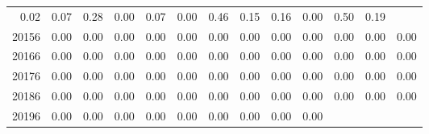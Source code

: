 \begin{table}[!h]
\begin{tabular}{lllllllllllll}
  \multicolumn{1}{|r}{0.02} &
  \multicolumn{1}{r}{0.07} &
  \multicolumn{1}{r}{0.28} &
  \multicolumn{1}{r}{0.00} &
  \multicolumn{1}{r}{0.07} &
  \multicolumn{1}{r}{0.00} &
  \multicolumn{1}{r}{0.46} &
  \multicolumn{1}{r}{0.15} &
  \multicolumn{1}{r}{0.16} &
  \multicolumn{1}{r}{0.00} &
  \multicolumn{1}{r}{0.50} &
  \multicolumn{1}{r}{0.19} \\
\multicolumn{1}{l}{\hspace{1em}20156} &
  \multicolumn{1}{|r}{0.00} &
  \multicolumn{1}{r}{0.00} &
  \multicolumn{1}{r}{0.00} &
  \multicolumn{1}{r}{0.00} &
  \multicolumn{1}{r}{0.00} &
  \multicolumn{1}{r}{0.00} &
  \multicolumn{1}{r}{0.00} &
  \multicolumn{1}{r}{0.00} &
  \multicolumn{1}{r}{0.00} &
  \multicolumn{1}{r}{0.00} &
  \multicolumn{1}{r}{0.00} &
  \multicolumn{1}{r}{0.00} \\
\multicolumn{1}{l}{\hspace{1em}20166} &
  \multicolumn{1}{|r}{0.00} &
  \multicolumn{1}{r}{0.00} &
  \multicolumn{1}{r}{0.00} &
  \multicolumn{1}{r}{0.00} &
  \multicolumn{1}{r}{0.00} &
  \multicolumn{1}{r}{0.00} &
  \multicolumn{1}{r}{0.00} &
  \multicolumn{1}{r}{0.00} &
  \multicolumn{1}{r}{0.00} &
  \multicolumn{1}{r}{0.00} &
  \multicolumn{1}{r}{0.00} &
  \multicolumn{1}{r}{0.00} \\
\multicolumn{1}{l}{\hspace{1em}20176} &
  \multicolumn{1}{|r}{0.00} &
  \multicolumn{1}{r}{0.00} &
  \multicolumn{1}{r}{0.00} &
  \multicolumn{1}{r}{0.00} &
  \multicolumn{1}{r}{0.00} &
  \multicolumn{1}{r}{0.00} &
  \multicolumn{1}{r}{0.00} &
  \multicolumn{1}{r}{0.00} &
  \multicolumn{1}{r}{0.00} &
  \multicolumn{1}{r}{0.00} &
  \multicolumn{1}{r}{0.00} &
  \multicolumn{1}{r}{0.00} \\
\multicolumn{1}{l}{\hspace{1em}20186} &
  \multicolumn{1}{|r}{0.00} &
  \multicolumn{1}{r}{0.00} &
  \multicolumn{1}{r}{0.00} &
  \multicolumn{1}{r}{0.00} &
  \multicolumn{1}{r}{0.00} &
  \multicolumn{1}{r}{0.00} &
  \multicolumn{1}{r}{0.00} &
  \multicolumn{1}{r}{0.00} &
  \multicolumn{1}{r}{0.00} &
  \multicolumn{1}{r}{0.00} &
  \multicolumn{1}{r}{0.00} &
  \multicolumn{1}{r}{0.00} \\
\multicolumn{1}{l}{\hspace{1em}20196} &
  \multicolumn{1}{|r}{0.00} &
  \multicolumn{1}{r}{0.00} &
  \multicolumn{1}{r}{0.00} &
  \multicolumn{1}{r}{0.00} &
  \multicolumn{1}{r}{0.00} &
  \multicolumn{1}{r}{0.00} &
  \multicolumn{1}{r}{0.00} &
  \multicolumn{1}{r}{0.00} &
  \multicolumn{1}{r}{0.00} &

\end{tabular}
\end{table}
